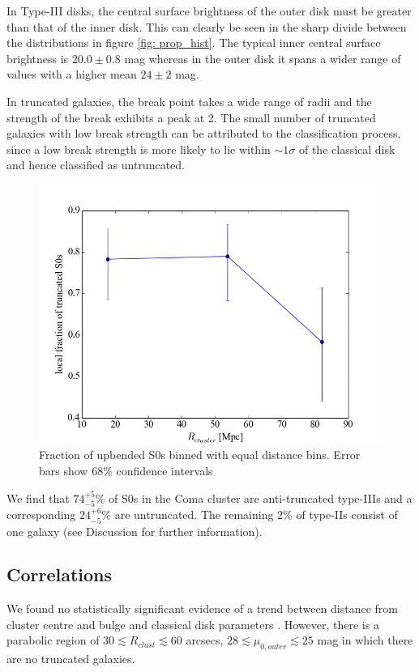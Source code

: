 In Type-III disks, the central surface brightness of the outer disk must be greater than that of the inner disk. This can clearly be seen in the sharp divide between the distributions in figure \ref{fig: prop_hist}. The typical inner central surface brightness is $20.0\pm 0.8$ mag whereas in the outer disk it spans a wider range of values with a higher mean $24 \pm 2$ mag.

In truncated galaxies, the break point takes a wide range of radii and the strength of the break exhibits a peak at 2. The small number of truncated galaxies with low break strength can be attributed to the classification process, since a low break strength is more likely to lie within $\sim 1\sigma$ of the classical disk and hence classified as untruncated. 

\begin{figure}[h]
	\centering
	\includegraphics[scale=0.5]{figs/fraction_vs_cluster_radius}
	\caption{\footnotesize{Fraction of upbended S0s binned with equal distance bins. Error bars show 68\% confidence intervals \citep{wilson_probable_1927}}}
	\label{fraction vs dist}
\end{figure}

We find that  $74^{+5}_{-5}\%$ of S0s in the Coma cluster are anti-truncated type-IIIs and a corresponding $24^{+6}_{-5}\%$ are untruncated. The remaining 2\% of type-IIs consist of one galaxy (see Discussion for further information). 


\subsection{Correlations} %
\label{sub:correlations}
We found no statistically significant evidence of a trend between distance from cluster centre and bulge and classical disk parameters . However, there is a parabolic region of $30 \lesssim R_{clust} \lesssim 60$ arcsecs, $28 \lesssim \mu_{0,outer} \lesssim 25$ mag in which there are no truncated galaxies.

